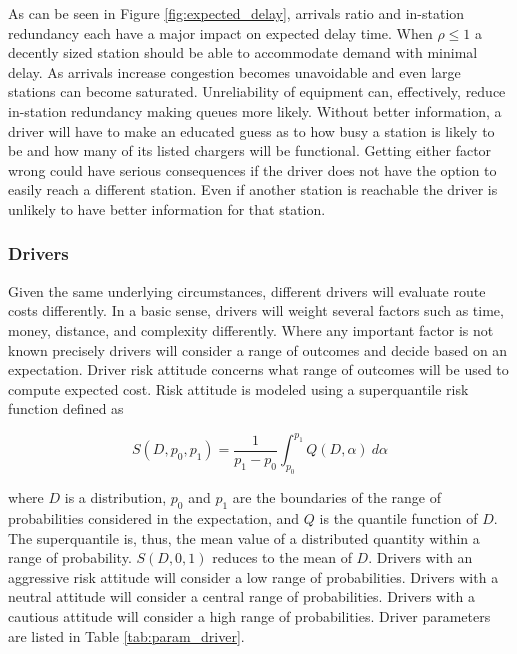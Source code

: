 \documentclass[11pt]{article}
\begin{document}
\begin{multicols}{2}

As can be seen in Figure \ref{fig:expected_delay}, arrivals ratio and in-station redundancy each have a major impact on expected delay time. When $\rho \leq 1$ a decently sized station should be able to accommodate demand with minimal delay. As arrivals increase congestion becomes unavoidable and even large stations can become saturated. Unreliability of equipment can, effectively, reduce in-station redundancy making queues more likely. Without better information, a driver will have to make an educated guess as to how busy a station is likely to be and how many of its listed chargers will be functional. Getting either factor wrong could have serious consequences if the driver does not have the option to easily reach a different station. Even if another station is reachable the driver is unlikely to have better information for that station.

\subsubsection*{Drivers}

Given the same underlying circumstances, different drivers will evaluate route costs differently. In a basic sense, drivers will weight several factors such as time, money, distance, and complexity differently. Where any important factor is not known precisely drivers will consider a range of outcomes and decide based on an expectation. Driver risk attitude concerns what range of outcomes will be used to compute expected cost. Risk attitude is modeled using a superquantile risk function defined as

\begin{equation}
	S(D, p_0, p_1) = \frac{1}{p_1 - p_0}\int_{p_0}^{p_1}Q(D, \alpha)\ d\alpha \label{eq:superquantile}
\end{equation}

\noindent where $D$ is a distribution, $p_0$ and $p_1$ are the boundaries of the range of probabilities considered in the expectation, and $Q$ is the quantile function of $D$. The superquantile is, thus, the mean value of a distributed quantity within a range of probability. $S(D, 0, 1)$ reduces to the mean of $D$. Drivers with an aggressive risk attitude will consider a low range of probabilities. Drivers with a neutral attitude will consider a central range of probabilities. Drivers with a cautious attitude will consider a high range of probabilities. Driver parameters are listed in Table \ref{tab:param_driver}.


\end{multicols}
\end{document}
